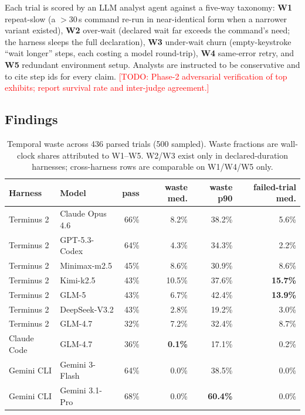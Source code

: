 \documentclass[10pt]{article}
\newcommand{\todo}[1]{\textcolor{red}{[TODO: #1]}}
\begin{document}
Each trial is scored by an LLM analyst agent against a five-way taxonomy:
\textbf{W1} repeat-slow (a $>$30\,s command re-run in near-identical form when
a narrower variant existed), \textbf{W2} over-wait (declared wait far exceeds
the command's need; the harness sleeps the full declaration), \textbf{W3}
under-wait churn (empty-keystroke ``wait longer'' steps, each costing a model
round-trip), \textbf{W4} same-error retry, and \textbf{W5} redundant
environment setup. Analysts are instructed to be conservative and to cite step
ids for every claim. \todo{Phase-2 adversarial verification of top exhibits;
report survival rate and inter-judge agreement.}

\subsection{Findings}

\begin{table}[t]
\centering
\small
\begin{tabular}{llrrrr}
\toprule
Harness & Model & pass & waste med. & waste p90 & failed-trial med. \\
\midrule
Terminus 2 & Claude Opus 4.6 & 66\% & 8.2\% & 38.2\% & 5.6\% \\
Terminus 2 & GPT-5.3-Codex   & 64\% & 4.3\% & 34.3\% & 2.2\% \\
Terminus 2 & Minimax-m2.5    & 45\% & 8.6\% & 30.9\% & 8.6\% \\
Terminus 2 & Kimi-k2.5       & 43\% & 10.5\% & 37.6\% & \textbf{15.7\%} \\
Terminus 2 & GLM-5           & 43\% & 6.7\% & 42.4\% & \textbf{13.9\%} \\
Terminus 2 & DeepSeek-V3.2   & 43\% & 2.8\% & 19.2\% & 3.0\% \\
Terminus 2 & GLM-4.7         & 32\% & 7.2\% & 32.4\% & 8.7\% \\
\midrule
Claude Code & GLM-4.7        & 36\% & \textbf{0.1\%} & 17.1\% & 0.2\% \\
Gemini CLI & Gemini 3-Flash  & 64\% & 0.0\% & 38.5\% & 0.0\% \\
Gemini CLI & Gemini 3.1-Pro  & 68\% & 0.0\% & \textbf{60.4\%} & 0.0\% \\
\bottomrule
\end{tabular}
\caption{Temporal waste across 436 parsed trials (500 sampled). Waste
fractions are wall-clock shares attributed to W1--W5. W2/W3 exist only in
declared-duration harnesses; cross-harness rows are comparable on W1/W4/W5
only.}
\label{tab:main}
\end{table}
\end{document}
